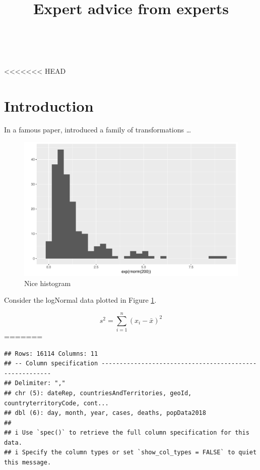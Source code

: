 \documentclass[11pt,a4paper,]{article}
\title{Expert advice from experts}
\author{\sf{\Large\textbf{Marie Curie}\\\large Nobel Prize, PhD\\[0.5cm]}{\Large\textbf{Pierre Curie}\\\large Nobel Prize, PhD\\[0.5cm]}}
\date{\sf\Date~\Month~\Year}
\makeatletter
\def\titlepage{\front{\expandafter{\@title}}{\@author}{\@organization}}
\makeatother
\begin{document}
\titlepage

<<<<<<< HEAD
\hypertarget{introduction}{%
\section{Introduction}\label{introduction}}

In a famous paper, \textcite{BC64} introduced a family of transformations \dots

\begin{figure}
\centering
\includegraphics{Report_files/figure-latex/histogram-1.pdf}
\caption{\label{fig:histogram}Nice histogram}
\end{figure}

Consider the logNormal data plotted in Figure \ref{fig:histogram}.

\[s^2 = \sum_{i=1}^n (x_i-\bar{x})^2\]
=======
\begin{verbatim}
## Rows: 16114 Columns: 11
## -- Column specification --------------------------------------------------------
## Delimiter: ","
## chr (5): dateRep, countriesAndTerritories, geoId, countryterritoryCode, cont...
## dbl (6): day, month, year, cases, deaths, popData2018
## 
## i Use `spec()` to retrieve the full column specification for this data.
## i Specify the column types or set `show_col_types = FALSE` to quiet this message.
\end{verbatim}
\end{document}
